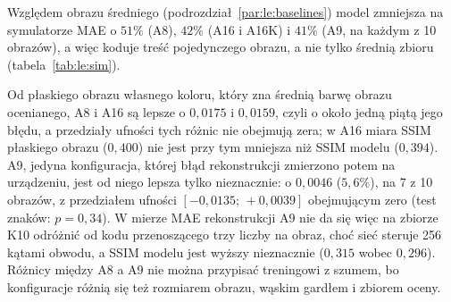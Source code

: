 Względem obrazu średniego (podrozdział~\ref{par:le:baselines}) model zmniejsza na symulatorze MAE o $51\%$ (A8), $42\%$ (A16 i A16K) i $41\%$ (A9, na każdym z 10 obrazów), a więc koduje treść pojedynczego obrazu, a nie tylko średnią zbioru (tabela~\ref{tab:le:sim}).

Od płaskiego obrazu własnego koloru, który zna średnią barwę obrazu ocenianego, A8 i A16 są lepsze o $0{,}0175$ i $0{,}0159$, czyli o około jedną piątą jego błędu, a przedziały ufności tych różnic nie obejmują zera; w A16 miara SSIM płaskiego obrazu ($0{,}400$) nie jest przy tym mniejsza niż SSIM modelu ($0{,}394$).
A9, jedyna konfiguracja, której błąd rekonstrukcji zmierzono potem na urządzeniu, jest od niego lepsza tylko nieznacznie: o $0{,}0046$ ($5{,}6\%$), na 7 z 10 obrazów, z przedziałem ufności $[-0{,}0135;\,+0{,}0039]$ obejmującym zero (test znaków: $p=0{,}34$).
W mierze MAE rekonstrukcji A9 nie da się więc na zbiorze K10 odróżnić od kodu przenoszącego trzy liczby na obraz, choć sieć steruje 256 kątami obwodu, a SSIM modelu jest wyższy nieznacznie ($0{,}315$ wobec $0{,}296$).
Różnicy między A8 a A9 nie można przypisać treningowi z szumem, bo konfiguracje różnią się też rozmiarem obrazu, wąskim gardłem i zbiorem oceny.

